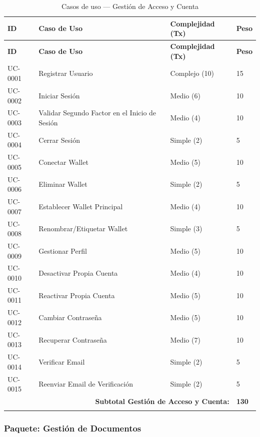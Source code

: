 \documentclass[11pt, a4paper]{article}
\begin{document}
\begin{longtable}{|p{1.8cm}|p{6.5cm}|p{3cm}|p{1.5cm}|}
\hline
\textbf{ID} & \textbf{Caso de Uso} & \textbf{Complejidad (Tx)} & \textbf{Peso} \\
\hline
\endfirsthead
\hline
\textbf{ID} & \textbf{Caso de Uso} & \textbf{Complejidad (Tx)} & \textbf{Peso} \\
\hline
\endhead
UC-0001 & Registrar Usuario & Complejo (10) & 15 \\
\hline
UC-0002 & Iniciar Sesión & Medio (6) & 10 \\
\hline
UC-0003 & Validar Segundo Factor en el Inicio de Sesión & Medio (4) & 10 \\
\hline
UC-0004 & Cerrar Sesión & Simple (2) & 5 \\
\hline
UC-0005 & Conectar Wallet & Medio (5) & 10 \\
\hline
UC-0006 & Eliminar Wallet & Simple (2) & 5 \\
\hline
UC-0007 & Establecer Wallet Principal & Medio (4) & 10 \\
\hline
UC-0008 & Renombrar/Etiquetar Wallet & Simple (3) & 5 \\
\hline
UC-0009 & Gestionar Perfil & Medio (5) & 10 \\
\hline
UC-0010 & Desactivar Propia Cuenta & Medio (4) & 10 \\
\hline
UC-0011 & Reactivar Propia Cuenta & Medio (5) & 10 \\
\hline
UC-0012 & Cambiar Contraseña & Medio (5) & 10 \\
\hline
UC-0013 & Recuperar Contraseña & Medio (7) & 10 \\
\hline
UC-0014 & Verificar Email & Simple (2) & 5 \\
\hline
UC-0015 & Reenviar Email de Verificación & Simple (2) & 5 \\
\hline
\multicolumn{3}{|r|}{\textbf{Subtotal Gestión de Acceso y Cuenta:}} & \textbf{130} \\
\hline
\caption{Casos de uso --- Gestión de Acceso y Cuenta}\label{tab:uc-acceso}
\end{longtable}

\subsubsection*{Paquete: Gestión de Documentos}
\end{document}
